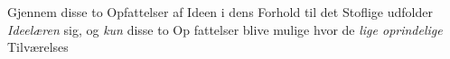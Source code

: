 Gjennem disse to Opfattelser af Ideen i dens Forhold til
det Stoflige udfolder \emph{Ideelæren} sig, og \emph{kun} disse to Op\-%
fattelser blive mulige hvor de \emph{lige oprindelige} Tilværelses\-%
%
